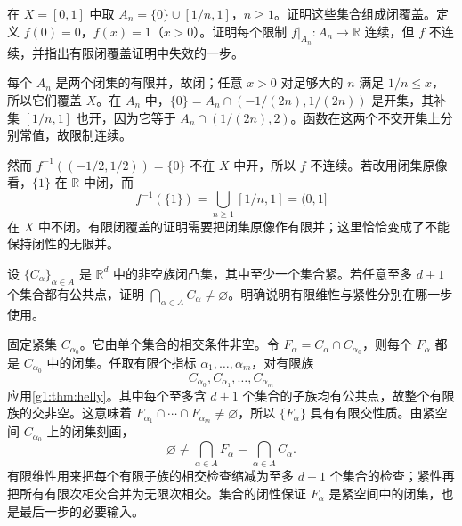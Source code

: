 \begin{exercise}\label{g1:ex:infinite-closed-pasting}
	在 \(X=[0,1]\) 中取 \(A_n=\{0\}\cup[1/n,1]\)，\(n\ge1\)。证明这些集合组成闭覆盖。定义 \(f(0)=0\)，\(f(x)=1\)（\(x>0\)）。证明每个限制 \(f|_{A_n}:A_n\to\mathbb R\) 连续，但 \(f\) 不连续，并指出有限闭覆盖证明中失效的一步。
\end{exercise}
\begin{solution}
	每个 \(A_n\) 是两个闭集的有限并，故闭；任意 \(x>0\) 对足够大的 \(n\) 满足 \(1/n\le x\)，所以它们覆盖 \(X\)。在 \(A_n\) 中，\(\{0\}=A_n\cap(-1/(2n),1/(2n))\) 是开集，其补集 \([1/n,1]\) 也开，因为它等于 \(A_n\cap(1/(2n),2)\)。函数在这两个不交开集上分别常值，故限制连续。

	然而 \(f^{-1}((-1/2,1/2))=\{0\}\) 不在 \(X\) 中开，所以 \(f\) 不连续。若改用闭集原像看，\(\{1\}\) 在 \(\mathbb R\) 中闭，而
	\[
		f^{-1}(\{1\})=\bigcup_{n\ge1}[1/n,1]=(0,1]
	\]
	在 \(X\) 中不闭。有限闭覆盖的证明需要把闭集原像作有限并；这里恰恰变成了不能保持闭性的无限并。
\end{solution}

\begin{exercise}\label{g1:exr:infinite-helly-compact}
	设 \(\{C_\alpha\}_{\alpha\in A}\) 是 \(\mathbb R^d\) 中的非空族闭凸集，其中至少一个集合紧。若任意至多 \(d+1\) 个集合都有公共点，证明 \(\bigcap_{\alpha\in A}C_\alpha\ne\varnothing\)。明确说明有限维性与紧性分别在哪一步使用。
\end{exercise}
\begin{solution}
	固定紧集 \(C_{\alpha_0}\)。它由单个集合的相交条件非空。令 \(F_\alpha=C_\alpha\cap C_{\alpha_0}\)，则每个 \(F_\alpha\) 都是 \(C_{\alpha_0}\) 中的闭集。任取有限个指标 \(\alpha_1,\ldots,\alpha_m\)，对有限族
	\[
		C_{\alpha_0},C_{\alpha_1},\ldots,C_{\alpha_m}
	\]
	应用\cref{g1:thm:helly}。其中每个至多含 \(d+1\) 个集合的子族均有公共点，故整个有限族的交非空。这意味着 \(F_{\alpha_1}\cap\cdots\cap F_{\alpha_m}\ne\varnothing\)，所以 \(\{F_\alpha\}\) 具有有限交性质。由紧空间 \(C_{\alpha_0}\) 上的闭集刻画，
	\[
		\varnothing\ne\bigcap_{\alpha\in A}F_\alpha
		=\bigcap_{\alpha\in A}C_\alpha.
	\]
	有限维性用来把每个有限子族的相交检查缩减为至多 \(d+1\) 个集合的检查；紧性再把所有有限次相交合并为无限次相交。集合的闭性保证 \(F_\alpha\) 是紧空间中的闭集，也是最后一步的必要输入。
\end{solution}

